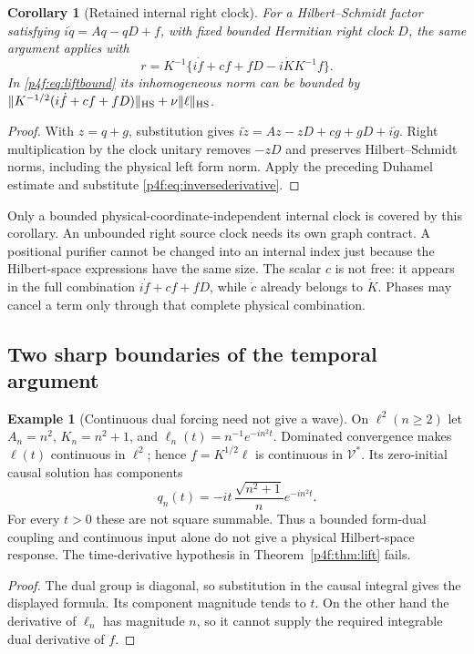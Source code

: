 \documentclass[11pt]{article}
\numberwithin{equation}{section}
\newtheorem{corollary}[theorem]{Corollary}
\theoremstyle{definition}
\newtheorem{example}[theorem]{Example}
\theoremstyle{remark}
\begin{document}
\begin{corollary}[Retained internal right clock]
\label{p4f:cor:clock}
For a Hilbert--Schmidt factor satisfying
$i\dot q=Aq-qD+f$, with fixed bounded Hermitian
right clock $D$, the same argument applies with
\[
 r=K^{-1}\{i\dot f+cf+fD-i\dot K K^{-1}f\}.
\]
In \eqref{p4f:eq:liftbound} its inhomogeneous norm can
be bounded by
$\|K^{-1/2}(i\dot f+cf+fD)\|_{\rm HS}
 +\nu\|\ell\|_{\rm HS}$.
\end{corollary}
\begin{proof}
With $z=q+g$, substitution gives
$i\dot z=Az-zD+cg+gD+i\dot g$.
Right multiplication by the clock unitary removes
$-zD$ and preserves Hilbert--Schmidt norms, including
the physical left form norm. Apply the preceding
Duhamel estimate and substitute \eqref{p4f:eq:inversederivative}.
\end{proof}

Only a bounded physical-coordinate-independent internal
clock is covered by this corollary. An unbounded right
source clock needs its own graph contract. A positional
purifier cannot be changed into an internal index just
because the Hilbert-space expressions have the same size.
The scalar $c$ is not free: it appears in the full
combination $i\dot f+cf+fD$, while $\dot c$ already belongs
to $\dot K$. Phases may cancel a term only through that
complete physical combination.

\subsection{Two sharp boundaries of the temporal argument}

\begin{example}[Continuous dual forcing need not give a wave]
\label{p4f:ex:roughforcing}
On $\ell^2(n\ge2)$ let $A_n=n^2$, $K_n=n^2+1$, and
$\ell_n(t)=n^{-1}e^{-in^2t}$. Dominated convergence
makes $\ell(t)$ continuous in $\ell^2$; hence
$f=K^{1/2}\ell$ is continuous in $\mathcal V^*$.
Its zero-initial causal solution has components
\[
 q_n(t)=-it\,\frac{\sqrt{n^2+1}}n e^{-in^2t}.
\]
For every $t>0$ these are not square summable.
Thus a bounded form-dual coupling and continuous
input alone do not give a physical Hilbert-space
response. The time-derivative hypothesis in
Theorem~\ref{p4f:thm:lift} fails.
\end{example}
\begin{proof}
The dual group is diagonal, so substitution in the
causal integral gives the displayed formula.
Its component magnitude tends to $t$. On the other
hand the derivative of $\ell_n$ has magnitude $n$,
so it cannot supply the required integrable dual
derivative of $f$.
\end{proof}
\end{document}
